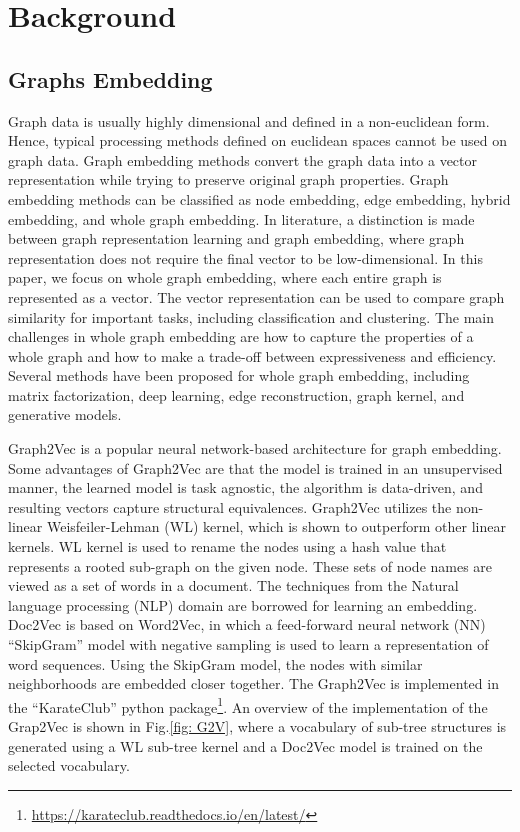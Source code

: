 \chapter{Background}\label{ch:Background}

\section{Graphs Embedding}
Graph data is usually highly dimensional and defined in a non-euclidean form. Hence, typical processing methods defined on euclidean spaces cannot be used on graph data. Graph embedding methods convert the graph data into a vector representation while trying to preserve original graph properties\cite{Cai2018}.%
Graph embedding methods can be classified as node embedding, edge embedding, hybrid embedding, and whole graph embedding. In literature, a distinction is made between graph representation learning and graph embedding\cite{Cai2018, Chami2022}, where graph representation does not require the final vector to be low-dimensional. In this paper, we focus on whole graph embedding, where each entire graph is represented as a vector\cite{Maddalena2021}. The vector representation can be used to compare graph similarity for important tasks, including classification and clustering. The main challenges in whole graph embedding are how to capture the properties of a whole graph and how to make a trade-off between expressiveness and efficiency\cite{Cai2018}. Several methods have been proposed for whole graph embedding, including matrix factorization, deep learning, edge reconstruction, graph kernel, and generative models\cite{Cai2018, Maddalena2021}.

Graph2Vec is a popular neural network-based architecture for graph embedding\cite{Narayanan2017}. Some advantages of Graph2Vec are that the model is trained in an unsupervised manner, the learned model is task agnostic, the algorithm is data-driven, and resulting vectors capture structural equivalences. Graph2Vec utilizes the non-linear Weisfeiler-Lehman (WL) kernel, %
which is shown to outperform other linear kernels\cite{shervashidze2011weisfeiler}. %
WL kernel is used to rename the nodes using a hash value that represents a rooted sub-graph on the given node. These sets of node names are viewed as a set of words in a document. The techniques from the Natural language processing (NLP) domain are borrowed for learning an embedding. Doc2Vec is based on Word2Vec\cite{Mikolov2013}, in which a feed-forward neural network (NN) ``SkipGram'' model with negative sampling is used to learn a representation of word sequences\cite{Le2014}. Using the SkipGram model, the nodes with similar neighborhoods are embedded closer together\cite{Rong2014}. The Graph2Vec is implemented in the ``KarateClub'' python package\cite{Karateclub}\footnote{\url{https://karateclub.readthedocs.io/en/latest/}}. An overview of the implementation of the Grap2Vec is shown in Fig.\ref{fig: G2V}, where a vocabulary of sub-tree structures is generated using a WL sub-tree kernel and a Doc2Vec model is trained on the selected vocabulary. 


